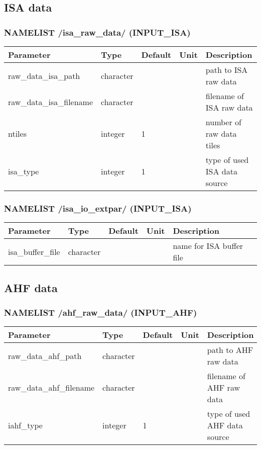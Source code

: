 \documentclass[a4paper,10pt,DIV14,BCOR1cm,titlepage,twoside]{scrartcl}
\providecommand{\tabularnewline}{\\}
\begin{document}
\subsection{ISA data}\label{namelist_input_for_extpar_isa}

\subsubsection*{NAMELIST /isa\_raw\_data/ (INPUT\_ISA)}

\begin{longtable}{|p{4cm}|p{1.5cm}|p{1.5cm}|p{1cm}|p{6cm}|}
\hline 
\textbf{Parameter}& \textbf{Type}& \textbf{Default}& \textbf{Unit}& \textbf{Description}
\tabularnewline
\hline
\endhead
\hline 
raw\_data\_isa\_path & character & &  & path to ISA raw data \tabularnewline
\hline 
raw\_data\_isa\_filename & character & &  & filename of ISA raw data \tabularnewline
\hline
ntiles & integer & 1 &  & number of raw data tiles \tabularnewline
\hline
isa\_type & integer & 1 &  & type of used ISA data source \tabularnewline
\hline
\bottomrule
\end{longtable}

\subsubsection*{NAMELIST /isa\_io\_extpar/ (INPUT\_ISA)}
\begin{longtable}{|p{4cm}|p{1.5cm}|p{1.5cm}|p{1cm}|p{6cm}|}
\hline 
\textbf{Parameter}& \textbf{Type}& \textbf{Default}& \textbf{Unit}& \textbf{Description}
\tabularnewline
\hline
\endhead
\hline
isa\_buffer\_file & character & &  & name for ISA buffer file
\tabularnewline
\hline 
\bottomrule
\end{longtable}

\subsection{AHF data}\label{namelist_input_for_extpar_ahf}

\subsubsection*{NAMELIST /ahf\_raw\_data/ (INPUT\_AHF)}

\begin{longtable}{|p{4cm}|p{1.5cm}|p{1.5cm}|p{1cm}|p{6cm}|}
\hline 
\textbf{Parameter}& \textbf{Type}& \textbf{Default}& \textbf{Unit}& \textbf{Description}
\tabularnewline
\hline
\endhead
\hline 
raw\_data\_ahf\_path & character & &  & path to AHF raw data \tabularnewline
\hline 
raw\_data\_ahf\_filename & character & &  & filename of AHF raw data \tabularnewline
\hline
iahf\_type & integer & 1 &  & type of used AHF data source \tabularnewline
\hline
\bottomrule
\end{longtable}
\end{document}
